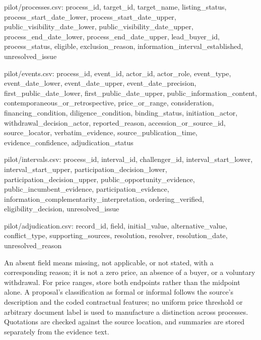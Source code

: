 \documentclass[
  11pt,
]{article}
\newenvironment{Shaded}{}{}
\newcommand{\NormalTok}[1]{#1}
\begin{document}
\begin{Shaded}
\begin{Highlighting}[]
\NormalTok{pilot/processes.csv:}
\NormalTok{process\_id, target\_id, target\_name, listing\_status,}
\NormalTok{process\_start\_date\_lower, process\_start\_date\_upper,}
\NormalTok{public\_visibility\_date\_lower, public\_visibility\_date\_upper,}
\NormalTok{process\_end\_date\_lower, process\_end\_date\_upper,}
\NormalTok{lead\_buyer\_id, process\_status, eligible, exclusion\_reason,}
\NormalTok{information\_interval\_established, unresolved\_issue}

\NormalTok{pilot/events.csv:}
\NormalTok{process\_id, event\_id, actor\_id, actor\_role, event\_type,}
\NormalTok{event\_date\_lower, event\_date\_upper, event\_date\_precision,}
\NormalTok{first\_public\_date\_lower, first\_public\_date\_upper,}
\NormalTok{public\_information\_content, contemporaneous\_or\_retrospective,}
\NormalTok{price\_or\_range, consideration, financing\_condition,}
\NormalTok{diligence\_condition, binding\_status, initiation\_actor,}
\NormalTok{withdrawal\_decision\_actor, reported\_reason,}
\NormalTok{accession\_or\_source\_id, source\_locator, verbatim\_evidence,}
\NormalTok{source\_publication\_time, evidence\_confidence, adjudication\_status}

\NormalTok{pilot/intervals.csv:}
\NormalTok{process\_id, interval\_id, challenger\_id,}
\NormalTok{interval\_start\_lower, interval\_start\_upper,}
\NormalTok{participation\_decision\_lower, participation\_decision\_upper,}
\NormalTok{public\_opportunity\_evidence, public\_incumbent\_evidence,}
\NormalTok{participation\_evidence, information\_complementarity\_interpretation,}
\NormalTok{ordering\_verified, eligibility\_decision, unresolved\_issue}

\NormalTok{pilot/adjudication.csv:}
\NormalTok{record\_id, field, initial\_value, alternative\_value,}
\NormalTok{conflict\_type, supporting\_sources, resolution, resolver,}
\NormalTok{resolution\_date, unresolved\_reason}
\end{Highlighting}
\end{Shaded}

An absent field means missing, not applicable, or not stated, with a
corresponding reason; it is not a zero price, an absence of a buyer, or
a voluntary withdrawal. For price ranges, store both endpoints rather
than the midpoint alone. A proposal's classification as formal or
informal follows the source's description and the coded contractual
features; no uniform price threshold or arbitrary document label is used
to manufacture a distinction across processes. Quotations are checked
against the source location, and summaries are stored separately from
the evidence text.
\end{document}
